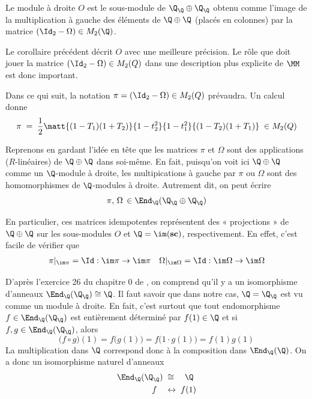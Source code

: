 \begin{Cor} Le module à droite $O$ est le sous-module de $\Q_\Q \oplus \Q_\Q$ obtenu comme l'image de la multiplication à gauche des éléments de $\Q \oplus \Q$ (placés en colonnes) par la matrice $(\Id_2 - \Omega) \in M_2(\Q)$. 
\end{Cor}

\begin{Rem} \label{pi} Le corollaire précédent décrit $O$ avec une meilleure précision. Le rôle que doit jouer la matrice $(\Id_2 - \Omega) \in M_2(Q)$ dans une description plus explicite de $\MM$ est donc important. 

Dans ce qui suit, la notation $\pi = (\Id_2 - \Omega) \in M_2(Q)$ prévaudra. Un calcul donne
$$ \pi \; = \; \frac{1}{2}\matt{(1-T_1)(1+T_2)}{1-t_2^2}{1-t_1^2}{(1-T_2)(1+T_1)} \; \in M_2(Q) $$
\end{Rem}

\begin{Rem} \label{piomega} Reprenons en gardant l'idée en tête que les matrices $\pi$ et $\Omega$ sont des applications ($R$-linéaires) de $\Q \oplus \Q$ dans soi-même. En fait, puisqu'on voit ici $\Q \oplus \Q$ comme un $\Q$-module à droite, les multipications à gauche par $\pi$ ou $\Omega$ sont des homomorphismes de $\Q$-modules à droite. Autrement dit, on peut écrire 
$$ \pi,\, \Omega \, \in \End_\Q(\Q_\Q \oplus \Q_\Q) $$ 

En particulier, ces matrices idempotentes représentent des « projections » de $\Q \oplus \Q$ sur les sous-modules $O$ et $\Q = \im (\mathbf{sc})$, respectivement. En effet, c'est facile de vérifier que 
\begin{align*}
\pi |_{\im \pi} = \Id : \im \pi \rightarrow \im \pi && \Omega |_{\im \Omega} = \Id : \im \Omega \rightarrow \im \Omega
\end{align*}
\end{Rem}

D'après l'exercice 26 du chapitre 0 de \cite{FDnoncom}, on comprend qu'il y a un isomorphisme d'anneaux $\End_\Q(\Q_\Q) \cong \Q$. Il faut savoir que dans notre cas, $\Q = \Q_\Q$ est vu comme un module à droite. En fait, c'est surtout que tout endomorphisme $f \in \End_\Q(\Q_\Q)$ est entièrement déterminé par $f(1) \in \Q$ et si $f, g \in \End_\Q(\Q_\Q)$, alors 
$$ \big(f \circ g\big) (1) = f\big(g(1)\big) = f\big(1 \cdot g(1)\big) = f(1)g(1) $$ 
La multiplication dans $\Q$ correspond donc à la composition dans $\End_\Q(\Q)$. On a donc un isomorphisme naturel d'anneaux
\begin{align*}
\End_\Q(\Q_\Q) \; &\cong \quad \Q\\
f \quad &\leftrightarrow \; f(1) 
\end{align*}

